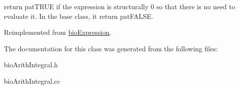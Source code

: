 return pat\+T\+R\+UE if the expression is structurally 0 so that there is no need to evaluate it. In the base class, it return pat\+F\+A\+L\+SE. 

Reimplemented from \hyperlink{classbio_expression_a264c6d78671610ada8261d698e4c4c42}{bio\+Expression}.



The documentation for this class was generated from the following files\+:\begin{DoxyCompactItemize}
\item 
bio\+Arith\+Integral.\+h\item 
bio\+Arith\+Integral.\+cc\end{DoxyCompactItemize}
